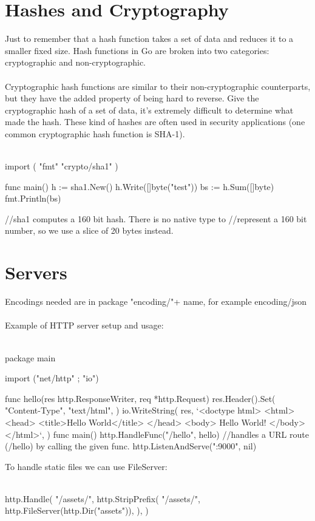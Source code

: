 \documentclass[twoside,a4paper,english]{report}
\begin{document}
\section{Hashes and Cryptography}
Just to remember that a hash function takes a set of data and reduces it to a smaller fixed size. Hash functions in Go are broken into two categories: cryptographic and non-cryptographic.\\\\

Cryptographic hash functions are similar to their non-cryptographic counterparts, but they have the added property of being hard to reverse. Give the cryptographic hash of a set of data, it's extremely difficult to determine what made the hash. These kind of hashes are often used in security applications (one common cryptographic hash function is SHA-1).\\\\
\begin{go}
import (
    "fmt"
    "crypto/sha1"
)

func main() {
    h := sha1.New()
    h.Write([]byte("test"))
    bs := h.Sum([]byte{})
    fmt.Println(bs)
}

//sha1 computes a 160 bit hash. There is no native type to 
//represent a 160 bit number, so we use a slice of 20 bytes instead.
\end{go}
\section{Servers}
Encodings needed are in package "encoding/"+ name, for example encoding/json\\\\
Example of HTTP server setup and usage:\\\\
\begin{go}
package main

import ("net/http" ; "io")

func hello(res http.ResponseWriter, req *http.Request) {
     res.Header().Set(
           "Content-Type",
           "text/html",
     )
     io.WriteString(
           res,
           `<doctype html>
<html>
  <head>
    <title>Hello World</title>
  </head>
     <body>
           Hello World!
     </body>
</html>`,
    ) 
}
func main() {
    http.HandleFunc("/hello", hello)  //handles a URL route (/hello) by calling the given func.
    http.ListenAndServe(":9000", nil)
}
\end{go}
To handle static files we can use FileServer:\\\\
\begin{go}
http.Handle(
    "/assets/",
    http.StripPrefix(
          "/assets/",
          http.FileServer(http.Dir("assets")),
    ),
)
\end{go}
\end{document}
